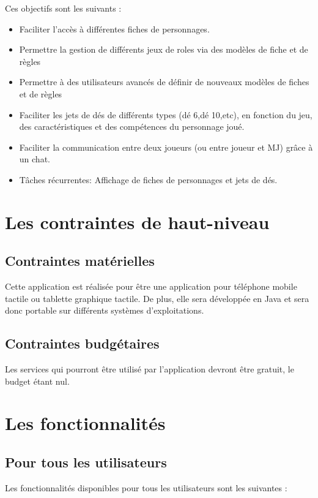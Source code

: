 ﻿\documentclass[11pt,a4paper]{article}
\begin{document}
Ces objectifs sont les suivants :

\begin{itemize}
  \item Faciliter l'accès à différentes fiches de personnages.
	\item Permettre la gestion de différents jeux de roles via des modèles de fiche
	et de règles
\item Permettre à des utilisateurs avancés de définir de nouveaux modèles de
fiches et de règles
  \item Faciliter les jets de dés de différents types (dé 6,dé 10,etc), en
  fonction du jeu, des caractéristiques et des compétences du personnage joué.
  \item Faciliter la communication entre deux joueurs (ou entre joueur et MJ)
  grâce à un chat.
  \item Tâches récurrentes: Affichage de fiches de personnages et jets de dés.
\end{itemize}

\clearpage

\section{Les contraintes de haut-niveau}
\subsection{Contraintes matérielles}

Cette application est réalisée pour être une application pour téléphone mobile
tactile ou tablette graphique tactile. De plus, elle sera développée en Java et
sera donc portable sur différents systèmes d'exploitations.

\subsection{Contraintes budgétaires}

Les services qui pourront être utilisé par l'application devront être gratuit, le budget étant nul.

\section{Les fonctionnalités}

\subsection{Pour tous les utilisateurs}
Les fonctionnalités disponibles pour tous les utilisateurs sont les suivantes :
\end{document}
